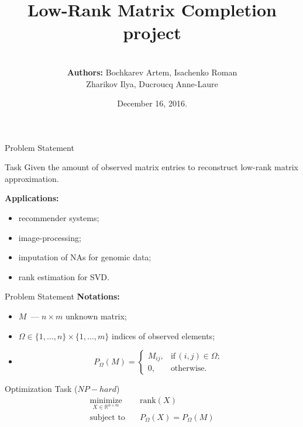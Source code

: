 \documentclass{beamer}
\title[\hbox to 56mm{Matrix Completion  \hfill\insertframenumber\,/\,\inserttotalframenumber}]
{Low-Rank Matrix Completion project}
\author[ROY team]{\\
				{\small \textbf{Authors:} Bochkarev Artem, Isachenko Roman \\
					Zharikov Ilya, Ducroucq Anne-Laure}}
\institute[SkolTech]{Skolkovo Institute of Science and Technology \\
	Methods of Optimization course 
    \vspace{0.3cm}
}
\date{December 16, 2016.}
\begin{document}
\begin{frame}
\titlepage
\end{frame}
\begin{frame}{Problem Statement}
\begin{block}{Task}	
	Given the amount of observed matrix entries to reconstruct low-rank matrix approximation.
\end{block}
\vspace{0.3cm}
\textbf{Applications:}
\begin{itemize}
	\item  recommender systems;
	\item image-processing;
	\item imputation of NAs for genomic data;
	\item rank estimation for SVD.
\end{itemize}
\end{frame}
\begin{frame}{Problem Statement}
\textbf{Notations:}
\begin{itemize}
	\item $M$~--- $n \times m$ unknown matrix;
	\item $\Omega \in \{1, \dots, n\} \times \{1, \dots, m\}$ indices of observed elements;
	\item 
	$$
	P_{\Omega} (M) = 
	\begin{cases}
	M_{ij}, &\text{if} \, (i, j) \in \Omega;\\
	0, &\text{otherwise}.
	\end{cases}
	$$
\end{itemize}
\begin{block}{Optimization Task ($NP-hard$)}
	\vspace{-0.5cm}
	\begin{align*}
		\mathop{\text{minimize}}\limits_{X \in \mathbb{R}^{n \times m}} \quad & 
		\text{rank} (X) \\
		\text{subject to} \quad & P_{\Omega} (X) = P_{\Omega} (M)
	\end{align*}
\end{block}
\end{frame}
\end{document}
